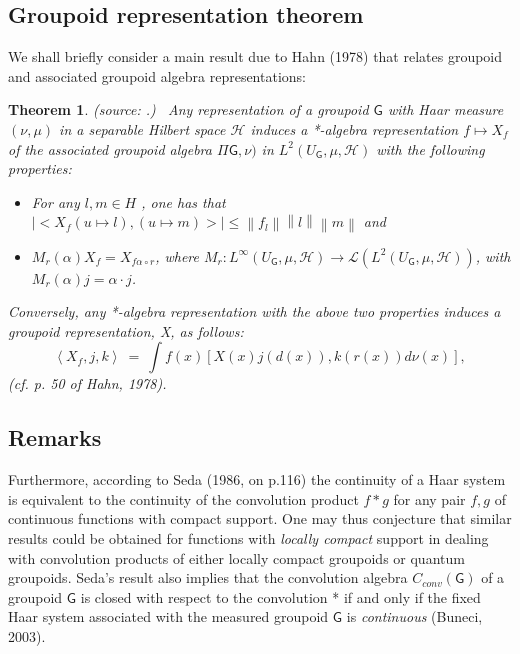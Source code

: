 \documentclass[12pt]{article}
\theoremstyle{plain}
\newtheorem{theorem}{Theorem}[section]
\theoremstyle{definition}
\numberwithin{equation}{section}
\renewcommand{\H}{\mathcal H}
\newcommand{\grp}{{\mathsf{G}}}
\newcommand{\<}{{\langle}}
\begin{document}
\subsection{Groupoid representation theorem}

  We shall briefly consider a main result due to Hahn (1978) that relates 
groupoid and associated groupoid algebra representations:

\begin{theorem} {\rm (source: \cite{Hahn78, Hahn2}.)}~
  Any representation of a groupoid $\grp$ with Haar measure $(\nu,
\mu)$ in a separable Hilbert space $\H$ induces a *-algebra
representation $f \mapsto X_f$ of the associated groupoid algebra
$ \Pi \grp, \nu)$ in $L^2 (U_{\grp} , \mu, \H )$ with the
following properties:
\begin{itemize}
\item[(1)]
For any $l,m \in H $ , one has that $\left|<X_f(u
\mapsto l), (u \mapsto m)>\right|\leq \left\|f_l\right\| \left\|l
\right\| \left\|m \right\|$ and

\item[(2)]  $M_r (\alpha) X_f = X_{f \alpha \circ r}$,  where
$M_r: L^\infty (U_{\grp}, \mu, \H)   \longrightarrow \mathcal L (
L^2 (U_{\grp}, \mu, \H))$, with $M_r (\alpha)j = \alpha \cdot j$.
\end{itemize}
Conversely, any *-algebra representation with the above two
properties induces a groupoid representation, X, as follows:
\begin{equation}
\left\langle X_f , j, k\right\rangle ~ = ~ \int
f(x)[X(x)j(d(x)),k(r(x))d \nu (x)],
\end{equation}
(cf. p. 50 of Hahn, 1978).
\end{theorem}

\subsection{Remarks}

 Furthermore, according to Seda (1986, on p.116) the continuity of a
Haar system is equivalent to the continuity of the convolution
product $f*g$ for any pair $f, g$ of continuous functions with
compact support. One may thus conjecture that similar results
could be obtained for functions with \textit{locally compact}
support in dealing with convolution products of either locally
compact groupoids or quantum groupoids. Seda's result also implies
that the convolution algebra $C_{conv}(\grp)$ of a groupoid $\grp$ is
closed with respect to the convolution {*} if and only if the fixed Haar
system associated with the measured groupoid $\grp$ is
\textit{continuous} (Buneci, 2003).
\end{document}
